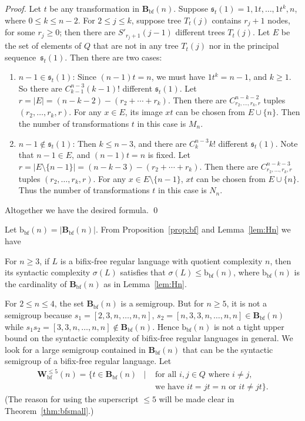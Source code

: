 \documentclass{llncs}
\renewcommand{\le}{\leqslant}
\renewcommand{\ge}{\geqslant}
\newcommand{\be}{\begin{enumerate}}
\newcommand{\ee}{\end{enumerate}}
\newcommand{\txt}[1]{\mbox{ #1 }}
\newcommand{\seq}{{\mathfrak{s}}}
\newcommand{\Bbf}{\mathbf{B}_{\mathrm{bf}}}
\newcommand{\Vbf}{\mathbf{W}^{\le 5}_{\mathrm{bf}}}
\newcommand{\bbf}{{\mathrm{b}_{\mathrm{bf}}}}
\begin{document}
\begin{proof} 
Let $t$ be any transformation in $\Bbf(n)$. Suppose $\seq_t(1) = 1,1t,\ldots,1t^k,n$, where $0 \le k \le n-2$. For $2 \le j \le k$, suppose tree $T_t(j)$ contains $r_j+1$ nodes, for some $r_j \ge 0$; then there are $S'_{r_j+1}(j-1)$ different trees $T_t(j)$. Let $E$ be the set of elements of $Q$ that are not in any tree $T_t(j)$ nor in the principal sequence~$\seq_t(1)$. Then there are two cases: 

\be 

\item $n-1 \in \seq_t(1)$: Since $(n-1)t = n$, we must have $1t^k = n-1$, and $k \ge 1$. So there are $C^{n-3}_{k-1} (k-1)!$ different $\seq_t(1)$. Let $r = |E| = (n-k-2) - (r_2 + \cdots + r_k)$. Then there are $C^{n-k-2}_{r_2,\ldots,r_k,r}$ tuples $(r_2,\ldots,r_k,r)$. For any $x \in E$, its image $xt$ can be chosen from $E \cup \{n\}$. Then the number of transformations $t$ in this case is $M_n$. 

\item $n-1 \not\in \seq_t(1)$: Then $k \le n-3$, and there are $C^{n-3}_k k!$ different $\seq_t(1)$. Note that $n-1 \in E$, and $(n-1)t = n$ is fixed. Let $r = |E \setminus \{n-1\}| = (n-k-3) - (r_2 + \cdots + r_k)$. Then there are $C^{n-k-3}_{r_2,\ldots,r_k,r}$ tuples $(r_2,\ldots,r_k,r)$. For any $x \in E \setminus \{n-1\}$, $xt$ can be chosen from $E \cup \{n\}$. Thus the number of transformations $t$ in this case is $N_n$. 

\ee

Altogether we have the desired formula. \qed
\end{proof}

Let $\bbf(n) = |\Bbf(n)|$. From Proposition~\ref{prop:bf} and Lemma~\ref{lem:Hn} we have 
\begin{proposition}\label{prop:Hncard} 
For $n \ge 3$, if $L$ is a bifix-free regular language with quotient complexity $n$, then its syntactic complexity $\sigma(L)$ satisfies that $\sigma(L) \le \bbf(n)$, where $\bbf(n)$ is the cardinality of $\Bbf(n)$ as in Lemma~\ref{lem:Hn}.
\end{proposition}


For $2 \le n \le 4$, the set $\Bbf(n)$ is a semigroup. But for $n \ge 5$, it is not a semigroup because $s_1 = [2,3,n,\ldots,n,n]$, $s_2 = [n,3,3,n,\ldots,n,n] \in \Bbf(n)$ while $s_1s_2 = [3,3,n,\ldots,n,n] \not\in \Bbf(n)$. Hence $\bbf(n)$ is not a tight upper bound on the syntactic complexity of bifix-free regular languages in general. We look for a large semigroup contained in $\Bbf(n)$ that can be the syntactic semigroup of a bifix-free regular language. Let 
\begin{eqnarray*}
\Vbf(n) = \{ t \in \Bbf(n) &\mid& \txt{for all} i, j \in Q \txt{where} i \neq j, \\
&& \txt{we have} it = jt = n \txt{or} it \neq jt \}.
\end{eqnarray*}
(The reason for using the superscript $\le 5$ will be made clear in Theorem~\ref{thm:bfsmall}.) 
\end{document}
